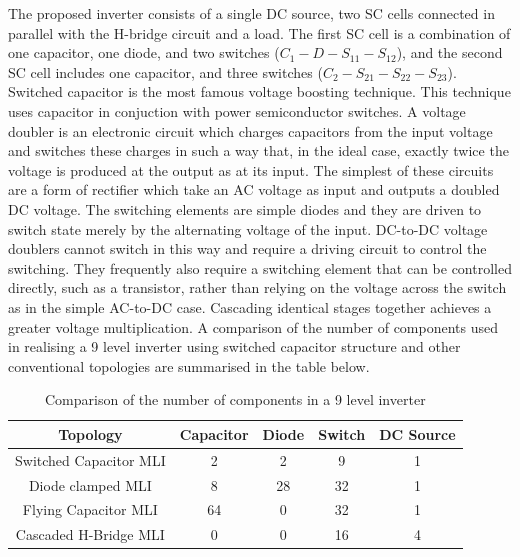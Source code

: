 \documentclass[12pt,a4paper]{report}
\begin{document}
 \hspace{0.2cm} The proposed inverter consists of a single DC source, two SC cells connected in parallel with the H-bridge circuit and a load. The first SC cell is a combination of one capacitor, one diode, and two switches ($C_1-D-S_{11}-S_{12}$), and the second SC cell includes one capacitor, and three switches ($C_2-S_{21}-S_{22}-S_{23}$). Switched capacitor is the most famous voltage boosting technique. This technique uses capacitor in conjuction with power semiconductor switches. A voltage doubler is an electronic circuit which charges capacitors from the input voltage and switches these charges in such a way that, in the ideal case, exactly twice the voltage is produced at the output as at its input. The simplest of these circuits are a form of rectifier which take an AC voltage as input and outputs a doubled DC voltage. The switching elements are simple diodes and they are driven to switch state merely by the alternating voltage of the input. DC-to-DC voltage doublers cannot switch in this way and require a driving circuit to control the switching. They frequently also require a switching element that can be controlled directly, such as a transistor, rather than relying on the voltage across the switch as in the simple AC-to-DC case. Cascading identical stages together achieves a greater voltage multiplication. A comparison of the number of components used in realising a 9 level inverter using switched capacitor structure and other conventional topologies are summarised in the table below.\\
 
 \begin{table}[H]
	\begin{center}
		\begin{tabular}{|c|c|c|c|c|} 
			\hline
			{\bf Topology} & {\bf Capacitor} & {\bf Diode} & {\bf Switch} & {\bf DC Source} \\  
			\hline
			Switched Capacitor MLI & 2 & 2 & 9 & 1 \\ 
			\hline
			Diode clamped MLI & 8 & 28 & 32 & 1 \\
			\hline
			Flying Capacitor MLI & 64 & 0 & 32 & 1 \\
			\hline
			Cascaded H-Bridge MLI & 0 & 0 & 16 & 4 \\
			\hline
		\end{tabular}
	\end{center}
	\caption{Comparison of the number of components in a 9 level inverter}
\end{table}
\end{document}
